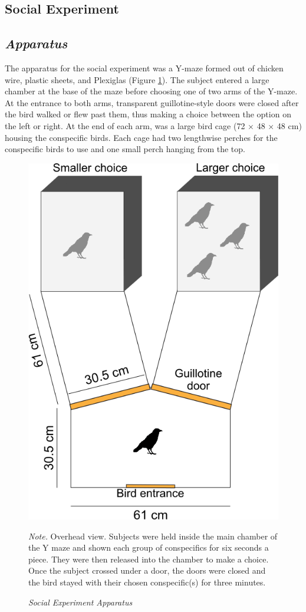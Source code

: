 \documentclass[
  ,pub,floatsintext]{apa6}
\begin{document}
\hypertarget{social-experiment}{%
\subsection{Social Experiment}\label{social-experiment}}

\hypertarget{apparatus}{%
\subsection{\texorpdfstring{\emph{Apparatus}}{Apparatus}}\label{apparatus}}

The apparatus for the social experiment was a Y-maze formed out of chicken wire, plastic sheets, and Plexiglas (Figure \ref{fig:socialapp}). The subject entered a large chamber at the base of the maze before choosing one of two arms of the Y-maze. At the entrance to both arms, transparent guillotine-style doors were closed after the bird walked or flew past them, thus making a choice between the option on the left or right. At the end of each arm, was a large bird cage (72 \(\times\) 48 \(\times\) 48 cm) housing the conspecific birds. Each cage had two lengthwise perches for the conspecific birds to use and one small perch hanging from the top.

\begin{figure}
\caption{\newline \emph{Social Experiment Apparatus} \label{fig:socialapp}}
\begin{center}
\includegraphics[width=0.65\linewidth]{"figures/social_apparatus.png"}
\end{center}

\textit{Note.} Overhead view. Subjects were held inside the main chamber of the Y maze and shown each group of conspecifics for six seconds a piece. They were then released into the chamber to make a choice. Once the subject crossed under a door, the doors were closed and the bird stayed with their chosen conspecific(s) for three minutes.
\end{figure}
\end{document}
